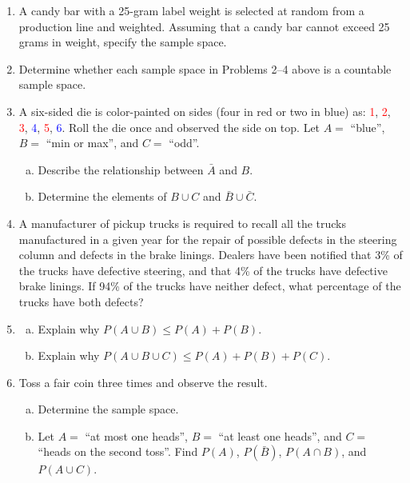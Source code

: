 \documentclass[12pt]{article}
\begin{document}
\begin{enumerate}
  \item A candy bar with a 25-gram label weight is selected at random from a production line and weighted. Assuming that a candy bar cannot exceed 25 grams in weight, specify the sample space.

\newpage

  \item Determine whether each sample space in Problems 2--4 above is a countable sample space.

  \item A six-sided die is color-painted on sides (four in red or two in blue) as: \textcolor{red}{1}, \textcolor{red}{2}, \textcolor{red}{3}, \textcolor{blue}{4}, \textcolor{red}{5}, \textcolor{blue}{6}. Roll the die once and observed the side on top. Let $A =$ ``blue'', $B =$ ``min or max'', and $C =$ ``odd''.
    \begin{enumerate}[(a)]
      \item Describe the relationship between $\bar{A}$ and $B$.
      \item Determine the elements of $B \cup C$ and $\bar{B} \cup \bar{C}$.
    \end{enumerate}

\newpage

  \item A manufacturer of pickup trucks is required to recall all the trucks manufactured in a given year for the repair of possible defects in the steering column and defects in the brake linings. Dealers have been notified that 3\% of the trucks have defective steering, and that 4\% of the trucks have defective brake linings. If 94\% of the trucks have neither defect, what percentage of the trucks have both defects?

  \item \begin{enumerate}[(a)]
      \item Explain why $P(A \cup B) \leq P(A) + P(B)$.
      \item Explain why $P(A \cup B \cup C) \leq P(A) + P(B) + P(C)$.
    \end{enumerate}

\newpage

  \item Toss a fair coin three times and observe the result.
    \begin{enumerate}[(a)]
      \item Determine the sample space.
      \item Let $A =$ ``at most one heads'', $B =$ ``at least one heads'', and $C =$ ``heads on the second toss''. Find $P(A)$, $P(\bar{B})$, $P(A \cap B)$, and $P(A \cup C)$.
    \end{enumerate}


\end{enumerate}
\end{document}
